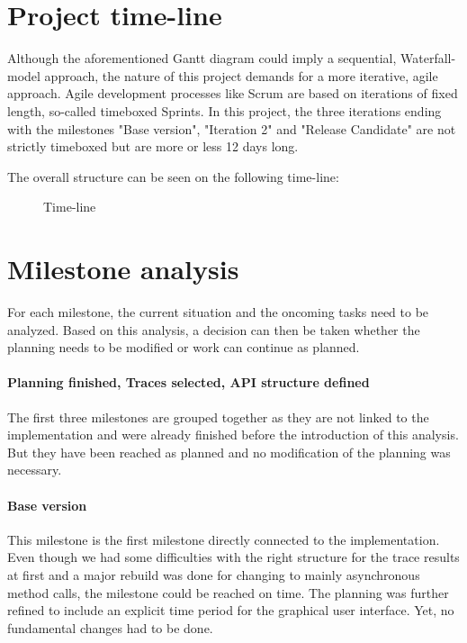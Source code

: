 \documentclass[
	a4paper,					10pt,							twoside,					openright,				notitlepage,			parskip=half,			]{scrreprt}
\begin{document}
\section{Project time-line}
\label{sec:intro_timeline}

Although the aforementioned Gantt diagram could imply a sequential, Waterfall-model
approach, the nature of this project demands for a more iterative, agile approach. 
Agile development processes like Scrum are based on iterations of fixed length, so-called
timeboxed Sprints. In this project, the three iterations ending with the milestones
"Base version", "Iteration 2" and "Release Candidate" are not strictly timeboxed but
are more or less 12 days long.

The overall structure can be seen on the following time-line:

\begin{figure}[H] 
\caption{Time-line}
\label{fig:timeline}
\end{figure}

\section{Milestone analysis}
\label{sec:intro_milestones}

For each milestone, the current situation and the oncoming tasks need to be analyzed. 
Based on this analysis, a decision can then be taken whether the planning needs to be modified
or work can continue as planned.

\paragraph{Planning finished, Traces selected, \gls{API} structure defined} 
The first three milestones are grouped together as they are not linked to the implementation
and were already finished before the introduction of this analysis. 
But they have been reached as planned and no modification of the planning was necessary.

\paragraph{Base version}
This milestone is the first milestone directly connected to the implementation. Even though we had
some difficulties with the right structure for the trace results at first and a major rebuild was done for changing
to mainly asynchronous method calls, the milestone could be reached on time.
The planning was further refined to include an explicit time period for the graphical user interface.
Yet, no fundamental changes had to be done.
\end{document}
